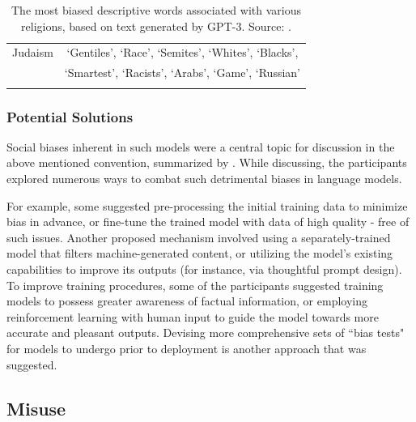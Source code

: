 \documentclass{article}
\begin{document}
\begin{table}[ht!]
\begin{center}
\begin{tabular}{c c}
            \addlinespace
            \hline
            \addlinespace
            Judaism &  ‘Gentiles’, ‘Race’, ‘Semites’, ‘Whites’, ‘Blacks’, \\
                    & ‘Smartest’, ‘Racists’, ‘Arabs’, ‘Game’, ‘Russian’ \\
            \addlinespace
            \hline
            \addlinespace
        \end{tabular}
        \caption{
            The most biased descriptive words associated with various religions, based on text generated by GPT-3. Source: \citet{brown2020gpt3}.
        }
        \label{tab:gpt3_tab6_2}
        \vspace{-6mm}
    \end{center}
\end{table}

\subsubsection{Potential Solutions}
\label{subsec:biases-sol}

Social biases inherent in such models were a central topic for discussion in the above mentioned convention, summarized by \citet{tamkin2021convention}. While discussing, the participants explored numerous ways to combat such detrimental biases in language models.

\medskip
\noindent
For example, some suggested pre-processing the initial training data to minimize bias in advance, or fine-tune the trained model with data of high quality - free of such issues. Another proposed mechanism involved using a separately-trained model that filters machine-generated content, or utilizing the model's existing capabilities to improve its outputs (for instance, via thoughtful prompt design). To improve training procedures, some of the participants suggested training models to possess greater awareness of factual information, or employing reinforcement learning with human input to guide the model towards more accurate and pleasant outputs. Devising more comprehensive sets of ``bias tests" for models to undergo prior to deployment is another approach that was suggested.



\subsection{Misuse}
\label{sec:misuse}
\end{document}
